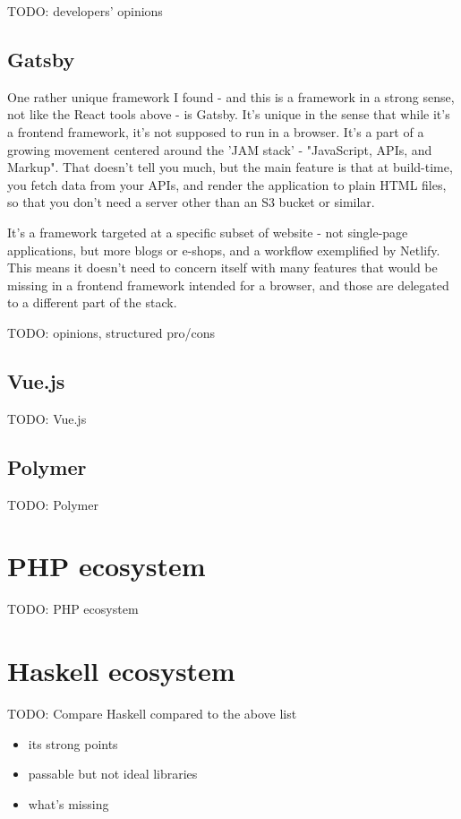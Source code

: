 \documentclass[english,odsaz]{fitthesis}
\begin{document}
TODO: developers' opinions

\subsection{Gatsby}
\label{sec:orgd101388}
One rather unique framework I found - and this is a framework in a strong
sense, not like the React tools above - is Gatsby. It's unique in the sense that
while it's a frontend framework, it's not supposed to run in a browser. It's a
part of a growing movement centered around the 'JAM stack' - "JavaScript, APIs,
and Markup". That doesn't tell you much, but the main feature is that at
build-time, you fetch data from your APIs, and render the application to plain
HTML files, so that you don't need a server other than an S3 bucket or similar.

It's a framework targeted at a specific subset of website - not single-page
applications, but more blogs or e-shops, and a workflow exemplified by Netlify.
This means it doesn't need to concern itself with many features that would be
missing in a frontend framework intended for a browser, and those are delegated
to a different part of the stack.

TODO: opinions, structured pro/cons

\subsection{Vue.js}
\label{sec:org317ae1d}
TODO: Vue.js

\subsection{Polymer}
\label{sec:org9edf765}
TODO: Polymer

\section{PHP ecosystem}
\label{sec:org20cd722}
TODO: PHP ecosystem

\section{Haskell ecosystem}
\label{sec:orge80f0df}
TODO: Compare Haskell compared to the above list

\begin{itemize}
\item its strong points
\item passable but not ideal libraries
\item what's missing
\end{itemize}
\end{document}
